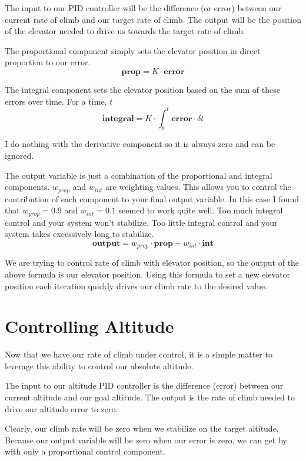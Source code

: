 \documentclass[12pt]{article}
\begin{document}
The input to our PID controller will be the difference (or error)
between our current rate of climb and our target rate of climb.  The
output will be the position of the elevator needed to drive us towards
the target rate of climb.

The proportional component simply sets the elevator position in direct
proportion to our error.
\[ \mathbf{prop} = K \cdot \mathbf{error} \]

The integral component sets the elevator position based on the sum of
these errors over time.  For a time, $t$
\[ \mathbf{integral} = K \cdot \int_{0}^{t} { \mathbf{error} \cdot \delta t } \]

I do nothing with the derivative component so it is always zero and
can be ignored.

The output variable is just a combination of the proportional and
integral components.  $w_{\mathit{prop}}$ and $w_{\mathit{int}}$ are
weighting values.  This allows you to control the contribution of each
component to your final output variable.  In this case I found that
$w_{\mathit{prop}} = 0.9$ and $w_{\mathit{int}} = 0.1$ seemed to work
quite well.  Too much integral control and your system won't
stabilize.  Too little integral control and your system takes
excessively long to stabilize.
\[
\mathbf{output} = w_{\mathit{prop}} \cdot \mathbf{prop} +
                     w_{\mathit{int}} \cdot \mathbf{int}
\]

We are trying to control rate of climb with elevator position, so the
output of the above formula is our elevator position.  Using this
formula to set a new elevator position each iteration quickly drives
our climb rate to the desired value.


\section{Controlling Altitude}

Now that we have our rate of climb under control, it is a simple
matter to leverage this ability to control our absolute altitude.

The input to our altitude PID controller is the difference (error)
between our current altitude and our goal altitude.  The output is the
rate of climb needed to drive our altitude error to zero.

Clearly, our climb rate will be zero when we stabilize on the target
altitude.  Because our output variable will be zero when our error is
zero, we can get by with only a proportional control component.
\end{document}
